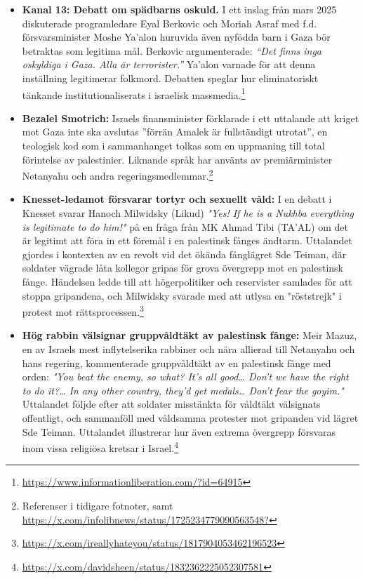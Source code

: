 \documentclass[12pt]{article}
\begin{document}
\begin{itemize}
\item \textbf{Kanal 13: Debatt om spädbarns oskuld.} I ett inslag från mars 2025 diskuterade programledare Eyal Berkovic och Moriah Asraf med f.d. försvarsminister Moshe Ya’alon huruvida även nyfödda barn i Gaza bör betraktas som legitima mål. Berkovic argumenterade: \textit{“Det finns inga oskyldiga i Gaza. Alla är terrorister.”} Ya’alon varnade för att denna inställning legitimerar folkmord. Debatten speglar hur eliminatoriskt tänkande institutionaliserats i israelisk massmedia.\footnote{\url{https://www.informationliberation.com/?id=64915}}

\item \textbf{Bezalel Smotrich:} Israels finansminister förklarade i ett uttalande att kriget mot Gaza inte ska avslutas ”förrän Amalek är fullständigt utrotat”, en teologisk kod som i sammanhanget tolkas som en uppmaning till total förintelse av palestinier. Liknande språk har använts av premiärminister Netanyahu och andra regeringsmedlemmar.\footnote{Referenser i tidigare fotnoter, samt \url{https://x.com/infolibnews/status/1725234779090563548?}}

\item \textbf{Knesset-ledamot försvarar tortyr och sexuellt våld:} I en debatt i Knesset svarar Hanoch Milwidsky (Likud) \textit{"Yes! If he is a Nukhba everything is legitimate to do him!"} på en fråga från MK Ahmad Tibi (TA'AL) om det är legitimt att föra in ett föremål i en palestinsk fånges ändtarm. Uttalandet gjordes i kontexten av en revolt vid det ökända fånglägret Sde Teiman, där soldater vägrade låta kollegor gripas för grova övergrepp mot en palestinsk fånge. Händelsen ledde till att högerpolitiker och reservister samlades för att stoppa gripandena, och Milwidsky svarade med att utlysa en "röststrejk" i protest mot rättsprocessen.\footnote{\url{https://x.com/ireallyhateyou/status/1817904053462196523}}

\item \textbf{Hög rabbin välsignar gruppvåldtäkt av palestinsk fånge:} Meir Mazuz, en av Israels mest inflytelserika rabbiner och nära allierad till Netanyahu och hans regering, kommenterade gruppvåldtäkt av en palestinsk fånge med orden: \textit{"You beat the enemy, so what? It's all good… Don't we have the right to do it?… In any other country, they'd get medals… Don't fear the goyim."} Uttalandet följde efter att soldater misstänkta för våldtäkt välsignats offentligt, och sammanföll med våldsamma protester mot gripanden vid lägret Sde Teiman. Uttalandet illustrerar hur även extrema övergrepp försvaras inom vissa religiösa kretsar i Israel.\footnote{\url{https://x.com/davidsheen/status/1832362225052307581}}


\end{itemize}
\end{document}
